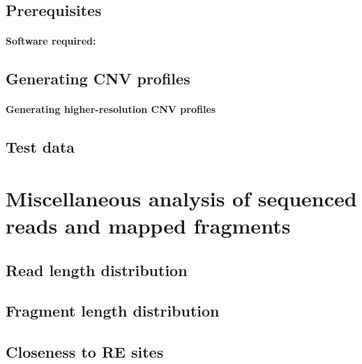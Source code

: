 \documentclass[11pt]{article}
\begin{document}
\subsection{Prerequisites}
\paragraph{Software required:}

\subsection{Generating CNV profiles}

\paragraph{Generating higher-resolution CNV profiles}

\subsection{Test data}


\section{Miscellaneous analysis of sequenced reads and mapped fragments}
\label{misc}

\subsection{Read length distribution}

\subsection{Fragment length distribution}

\subsection{Closeness to RE sites}




\end{document}
